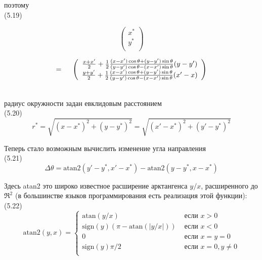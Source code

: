\documentclass[10pt,a4paper]{article}
\begin{document}
поэтому\\

(5.19)
\begin{minipage}{0.2\textwidth}
	\begin{equation*}
	\left(\begin{array}{c}
	x^*\\
	y^*\\
	\end{array}\right)
	\end{equation*}
\end{minipage}
\begin{minipage}{0.2\textwidth}
	\begin{equation*}
	\mbox {=} \hspace{5mm}
	\left(\begin{array}{c}
	\frac{x+x'}{2}+\frac{1}{2}\frac{(x-x')\cos\theta+(y-y')\sin\theta}{(y-y')\cos\theta-(x-x')\sin\theta}(y-y')\\
	\frac{y+y'}{2}+\frac{1}{2}\frac{(x-x')\cos\theta+(y-y')\sin\theta}{(y-y')\cos\theta-(x-x')\sin\theta}(x'-x)\\
	\end{array}\right)
	\end{equation*}
\end{minipage}\\

радиус окружности задан евклидовым расстоянием\\

(5.20)
$$r^*=\sqrt{(x-x^*)^2+(y-y^*)^2}=\sqrt{(x'-x^*)^2+(y'-y^*)^2}$$

Теперь стало возможным вычислить изменение угла направления\\

(5.21)
$$\varDelta\theta=\text{atan}2(y'-y^*,x'-x^*)-\text{atan}2(y-y^*,x-x^*)$$

Здесь atan2 это широко известное расширение арктангенса $y/x$, расширенного до $\Re^2$ (в большинстве языков программирования есть реализация этой функции):\\

(5.22)
\begin{equation*}
\text{atan}2(y,x)=\left\{
\begin{array}{ll}
\text{atan}(y/x) & \mbox{ если }x>0\\
\text{sign}(y)(\pi-\text{atan}(|y/x|))& \mbox{ если }x<0\\
0&\mbox{ если }x=y=0\\
\text{sign}(y)\pi/2& \mbox{ если }x=0,y\neq0\\
\end{array}
\right.
\end{equation*}
\end{document}
